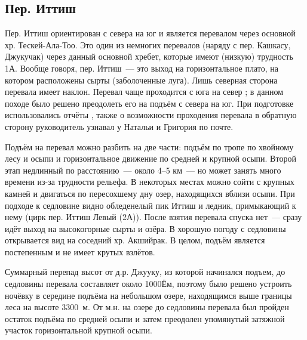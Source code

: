 \subsection{Пер. Иттиш}

Пер. Иттиш ориентирован с севера на юг и является перевалом через основной хр. Тескей-Ала-Тоо. Это один из немногих перевалов (наряду с пер. Кашкасу, Джукучак) через данный основной хребет, которые имеют (низкую) трудность 1А. Вообще говоря, пер. Иттиш~--- это выход на горизонтальное плато, на котором расположены сырты (заболоченные луга). Лишь северная сторона перевала имеет наклон. Перевал чаще проходится с юга на север \cite{kovinov2021,sergeev2024,tipsina2024}; в данном походе было решено преодолеть его на подъём с севера на юг. При подготовке использовались отчёты \cite{kovinov2021,sergeev2024,tipsina2024}, также о возможности проходения перевала в обратную сторону руководитель узнавал у Натальи и Григория по почте.

Подъём на перевал можно разбить на две части: подъём по тропе по хвойному лесу и осыпи и горизонтальное движение по средней и крупной осыпи. Второй этап недлинный по расстоянию~--- около 4--5 км~--- но может занять много времени из-за трудности рельефа. В некоторых местах можно сойти с крупных камней и двигаться по пересохшему дну озер, находящихся вблизи осыпи. При подходе к седловине видно обледенелый пик Иттиш и ледник, примыкающий к нему (цирк пер. Иттиш Левый (2А)). После взятия перевала спуска нет~--- сразу идёт выход на высокогорные сырты и озёра. В хорошую погоду с седловины открывается вид на соседний хр. Акшийрак. В целом, подъём является постепенным и не имеет крутых взлётов.

Суммарный перепад высот от д.р. Джууку, из которой начинался подъем, до седловины перевала составляет около 1000Ём, поэтому было решено устроить ночёвку в середине подъёма на небольшом озере, находящимся выше границы леса на высоте 3300~м. От м.н. на озере до седловины перевала был пройден остаток подъёма по средней осыпи и затем преодолен упомянутый затяжной участок горизонтальной крупной осыпи.